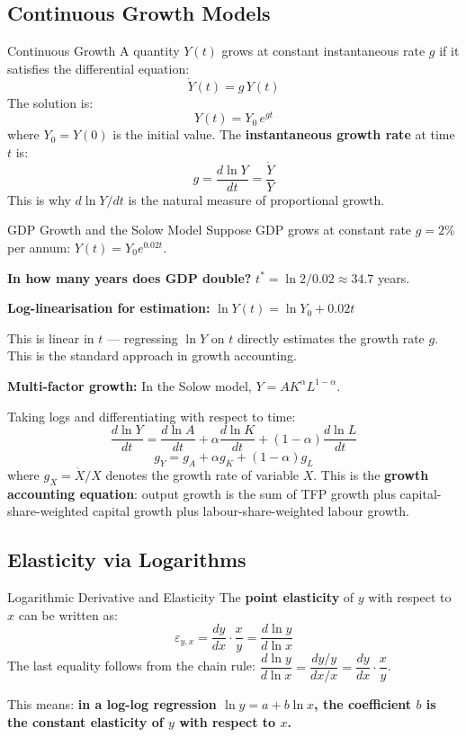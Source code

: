 \documentclass[12pt, a4paper]{article}
\theoremstyle{definition}
\newcommand{\ddd}[2]{\dfrac{d#1}{d#2}}
\begin{document}
\subsection{Continuous Growth Models}

\begin{defbox}{Continuous Growth}
A quantity $Y(t)$ grows at constant instantaneous rate $g$ if it satisfies the differential equation:
\[
  \dot Y(t) = g\,Y(t)
\]
The solution is:
\[
  Y(t) = Y_0\,e^{gt}
\]
where $Y_0 = Y(0)$ is the initial value. The \textbf{instantaneous growth rate} at time $t$ is:
\[
  g = \ddd{\ln Y}{t} = \frac{\dot Y}{Y}
\]
This is why $d\ln Y/dt$ is the natural measure of proportional growth.
\end{defbox}

\begin{exbox}{GDP Growth and the Solow Model}
Suppose GDP grows at constant rate $g=2\%$ per annum:
$Y(t) = Y_0 e^{0.02t}$.

\textbf{In how many years does GDP double?}
$t^* = \ln2/0.02 \approx 34.7$ years.

\textbf{Log-linearisation for estimation:}
$\ln Y(t) = \ln Y_0 + 0.02t$

This is linear in $t$ --- regressing $\ln Y$ on $t$ directly estimates the growth rate $g$. This is the standard approach in growth accounting.

\textbf{Multi-factor growth:} In the Solow model, $Y = AK^\alpha L^{1-\alpha}$.

Taking logs and differentiating with respect to time:
\[
  \ddd{\ln Y}{t} = \ddd{\ln A}{t} + \alpha\ddd{\ln K}{t} + (1-\alpha)\ddd{\ln L}{t}
\]
\[
  g_Y = g_A + \alpha g_K + (1-\alpha)g_L
\]
where $g_X = \dot X/X$ denotes the growth rate of variable $X$. This is the \textbf{growth accounting equation}: output growth is the sum of TFP growth plus capital-share-weighted capital growth plus labour-share-weighted labour growth.
\end{exbox}

\subsection{Elasticity via Logarithms}

\begin{defbox}{Logarithmic Derivative and Elasticity}
The \textbf{point elasticity} of $y$ with respect to $x$ can be written as:
\[
  \varepsilon_{y,x}
  = \ddd{y}{x}\cdot\frac{x}{y}
  = \ddd{\ln y}{\ln x}
\]
The last equality follows from the chain rule:
$\dfrac{d\ln y}{d\ln x} = \dfrac{dy/y}{dx/x} = \dfrac{dy}{dx}\cdot\dfrac{x}{y}$.

This means: \textbf{in a log-log regression $\ln y = a + b\ln x$, the coefficient $b$ is the constant elasticity of $y$ with respect to $x$.}
\end{defbox}
\end{document}
